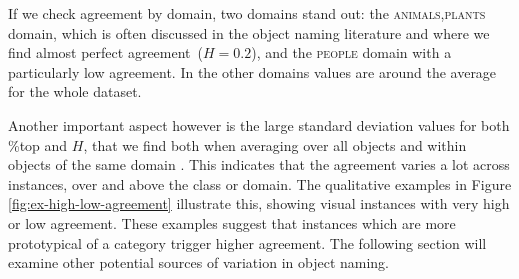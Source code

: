 If we check agreement by domain, two domains stand out: the \textsc{animals,plants} domain, which is often discussed in the object naming literature and where we find almost perfect agreement\ (\mbox{$H=0.2$}), and the \textsc{people} domain with a particularly low agreement.
In the other domains values are around the average for the whole dataset.

Another important aspect however is the large standard deviation values for both \%top and $H$, that we find both when averaging over all objects and within objects of the same domain . This indicates that the agreement varies a lot across instances, over and above the class or domain.
The qualitative examples in Figure \ref{fig:ex-high-low-agreement} %
illustrate this, showing visual instances with very high or low agreement. 
These examples suggest that instances which are more prototypical of a category trigger higher agreement.
The following section will examine other potential sources of variation in object naming.


